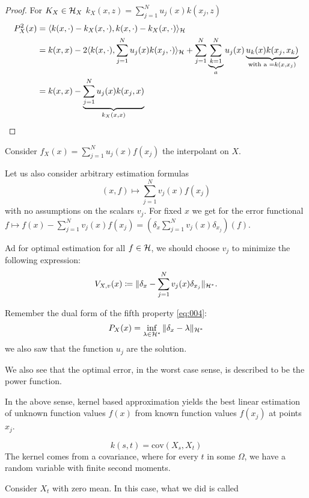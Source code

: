 \begin{proof}
    For $K_X\in \mathcal{H}_X$ $k_X(x,z)=\sum_{j=1}^{N}u_j(x)k(x_j,z)$
    \begin{align*}
        P_X^2(x)&=\langle k(x,\cdot)-k_X(x,\cdot),k(x,\cdot)-k_X(x,\cdot) \rangle_{\mathcal{H}}\\
        &=k(x,x)-2\langle k(x,\cdot),\sum_{j=1}^N u_j(x)k(x_j,\cdot) \rangle_{\mathcal{H}}+\sum_{j=1}^N\underbrace{\sum_{k=1}^{N}}_{a}u_j(x)\underbrace{u_k(x)k(x_j,x_k)}_{\text{with a } =k(x,x_j)}\\
        &=k(x,x)-\underbrace{\sum_{j=1}^N u_j(x)k(x_j,x)}_{k_X(x,x)}\qedhere
    \end{align*}    
\end{proof}

Consider $f_X(x)=\sum_{j=1}^Nu_j(x)f(x_j)$ the interpolant on $X$.

Let us also consider arbitrary estimation formulas 
\[(x,f)\mapsto \sum_{j=1}^N v_j(x)f(x_j)\]
with no assumptions on the scalars $v_j$. For fixed $x$ we get for the 
error functional $f\mapsto f(x)-\sum_{j=1}^{N} v_j(x)f(x_j)=\left(\delta_x \sum_{j=1}^N v_j(x)\delta_{x_j}\right)(f)$.

Ad for optimal estimation for all $f\in\mathcal{H}$, we should choose 
$v_j$ to minimize the following expression:
\[V_{X,v}(x)\coloneqq \Vert \delta_x-\sum_{j=1}^{N} v_j(x)\delta_{x_j}\Vert_{\mathcal{H}^*}.\]

Remember the dual form of the fifth property \ref{eq:004}:
\[P_X(x)=\inf_{\lambda\in\mathcal{H}^*}\Vert \delta_x-\lambda\Vert_{\mathcal{H}^*}\] 
we also saw that the function $u_j$ are the solution.

We also see that the optimal error, in the worst case sense, is described to be the power function.

\begin{theorem}\label{thm:2.5}
    In the above sense, kernel based approximation yields the best linear 
    estimation of unknown function values $f(x)$ from known function values $f(x_j)$
    at points $x_j$.
\end{theorem}

\[k(s,t)=\text{cov}(X_s,X_t)\]
The kernel comes from a covariance, where 
for every $t$ in some $\Omega$, we have a random variable with finite  second moments.

Consider $X_t$ with zero mean. In this case, what we did is called 

